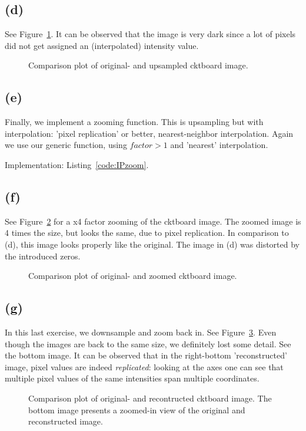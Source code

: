 \documentclass{article}
\begin{document}
\subsection*{(d)} See Figure~\ref{fig:upsampling}. It can be observed that the image is very dark since a lot of pixels did not get assigned an (interpolated) intensity value.

\begin{figure}[ht]
    \centering
    
    \caption{Comparison plot of original- and upsampled cktboard image.}
    \label{fig:upsampling}
\end{figure}

\subsection*{(e)} Finally, we implement a zooming function. This is upsampling but with interpolation: 'pixel replication' or better, nearest-neighbor interpolation. Again we use our generic function, using $factor > 1$ and 'nearest' interpolation.

 Implementation: Listing~\ref{code:IPzoom}.

\subsection*{(f)} See Figure~\ref{fig:zoom} for a x4 factor zooming of the cktboard image. The zoomed image is 4 times the size, but looks the same, due to pixel replication. In comparison to (d), this image looks properly like the original. The image in (d) was distorted by the introduced zeros.
\begin{figure}[ht]
    \centering
    
    \caption{Comparison plot of original- and zoomed cktboard image.}
    \label{fig:zoom}
\end{figure}

\subsection*{(g)} In this last exercise, we downsample and zoom back in. See Figure~\ref{fig:reconstruction}. Even though the images are back to the same size, we definitely lost some detail. See the bottom image. It can be observed that in the right-bottom 'reconstructed' image, pixel values are indeed \textit{replicated}: looking at the axes one can see that multiple pixel values of the same intensities span multiple coordinates.
\begin{figure}[ht]
    \centering
    
    
    \caption{Comparison plot of original- and recontructed cktboard image. The bottom image presents a zoomed-in view of the original and reconstructed image.}
    \label{fig:reconstruction}
\end{figure}
\end{document}
